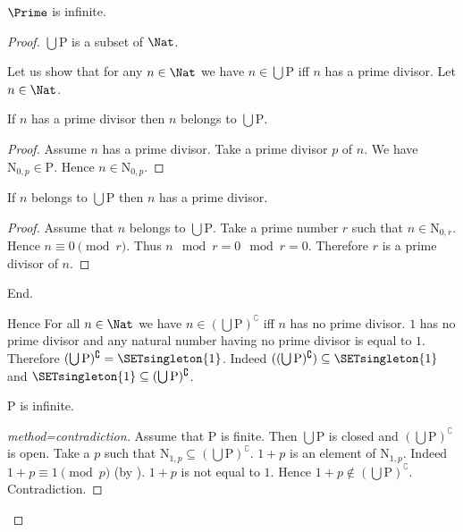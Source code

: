 \documentclass{article}
\newcommand{\N}{\mathrm{N}}
\newcommand{\Ps}{\mathrm{P}}
\begin{document}
\begin{forthel}
    \begin{theorem}[title=Furstenberg]
      $\Prime$ is infinite.
    \end{theorem}
    \begin{proof}
      $\bigcup \Ps$ is a subset of $\Nat$.

      Let us show that for any $n \in \Nat$ we have $n \in \bigcup \Ps$ iff $n$
      has a prime divisor.
        Let $n \in \Nat$.

        If $n$ has a prime divisor then $n$ belongs to $\bigcup \Ps$.
        \begin{proof}
          Assume $n$ has a prime divisor.
          Take a prime divisor $p$ of $n$.
          We have $\N_{0, p} \in \Ps$.
          Hence $n \in \N_{0, p}$.
        \end{proof}

        If $n$ belongs to $\bigcup \Ps$ then $n$ has a prime divisor.
        \begin{proof}
          Assume that $n$ belongs to $\bigcup \Ps$.
          Take a prime number $r$ such that $n \in \N_{0, r}$.
          Hence $n \equiv 0 \pmod{r}$.
          Thus $n \mod r = 0 \mod r = 0$.
          Therefore $r$ is a prime divisor of $n$.
        \end{proof}
      End.

      Hence For all $n \in \Nat$ we have $n \in (\bigcup \Ps)^\complement$ iff
      $n$ has no prime divisor.
      $1$ has no prime divisor and any natural number having no prime
      divisor is equal to $1$.
      Therefore $(\bigcup \Ps)^\complement = \SETsingleton{1}$.
      Indeed $((\bigcup \Ps)^\complement) \subseteq \SETsingleton{1}$ and $\SETsingleton{1}
      \subseteq (\bigcup \Ps)^\complement$. %

      $\Ps$ is infinite.
      \begin{proof}[method=contradiction]
        Assume that $\Ps$ is finite.
        Then $\bigcup \Ps$ is closed and $(\bigcup \Ps)^\complement$ is open.
        Take a $p$ such that $\N_{1, p} \subseteq (\bigcup \Ps)^\complement$.
        $1 + p$ is an element of $\N_{1, p}$.
        Indeed $1 + p \equiv 1 \pmod{p}$
        (by ).
        $1 + p$ is not equal to $1$.
        Hence $1 + p \notin (\bigcup \Ps)^\complement$.
        Contradiction.
      \end{proof}
    \end{proof}
  \end{forthel}

  \printbibliography
\end{document}
